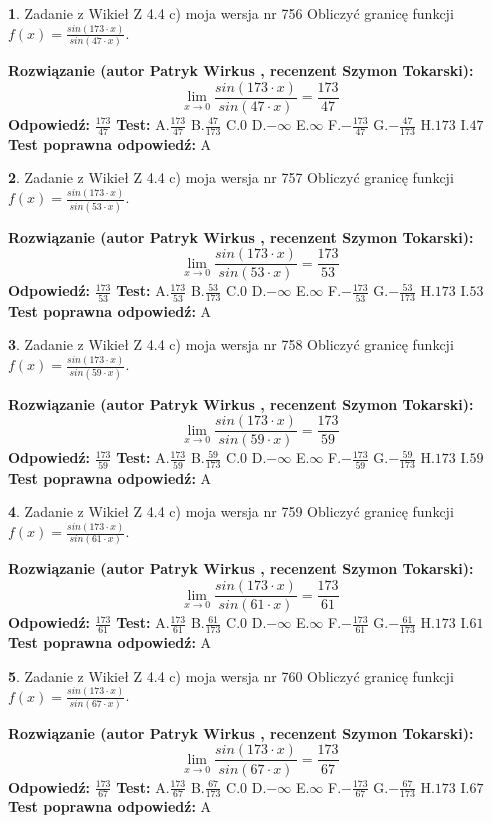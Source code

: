 \documentclass[12pt, a4paper]{article}
\theoremstyle{definition} %
\newtheorem{zad}{}
\newcommand{\zadStart}[1]{\begin{zad}#1\newline}
\newcommand{\zadStop}{\end{zad}}
\newcommand{\rozwStart}[2]{\noindent \textbf{Rozwiązanie (autor #1 , recenzent #2): }\newline}
\newcommand{\rozwStop}{\newline}
\newcommand{\odpStart}{\noindent \textbf{Odpowiedź:}\newline}
\newcommand{\odpStop}{\newline}
\newcommand{\testStart}{\noindent \textbf{Test:}\newline}
\newcommand{\testStop}{\newline}
\newcommand{\kluczStart}{\noindent \textbf{Test poprawna odpowiedź:}\newline}
\newcommand{\kluczStop}{\newline}
\begin{document}
\zadStart{Zadanie z Wikieł Z 4.4 c) moja wersja nr 756}
Obliczyć granicę funkcji $f(x)=\frac{sin(173\cdot x)}{sin(47\cdot x)}$.
\zadStop
\rozwStart{Patryk Wirkus}{Szymon Tokarski}
$$\lim\limits_{x\to 0}\frac{sin(173\cdot x)}{sin(47\cdot x)}=
\frac{173}{47}$$
\rozwStop
\odpStart
$\frac{173}{47}$
\odpStop
\testStart
A.$\frac{173}{47}$
B.$\frac{47}{173}$
C.$0$
D.$-\infty$
E.$\infty$
F.$-\frac{173}{47}$
G.$-\frac{47}{173}$
H.$173$
I.$47$
\testStop
\kluczStart
A
\kluczStop



\zadStart{Zadanie z Wikieł Z 4.4 c) moja wersja nr 757}
Obliczyć granicę funkcji $f(x)=\frac{sin(173\cdot x)}{sin(53\cdot x)}$.
\zadStop
\rozwStart{Patryk Wirkus}{Szymon Tokarski}
$$\lim\limits_{x\to 0}\frac{sin(173\cdot x)}{sin(53\cdot x)}=
\frac{173}{53}$$
\rozwStop
\odpStart
$\frac{173}{53}$
\odpStop
\testStart
A.$\frac{173}{53}$
B.$\frac{53}{173}$
C.$0$
D.$-\infty$
E.$\infty$
F.$-\frac{173}{53}$
G.$-\frac{53}{173}$
H.$173$
I.$53$
\testStop
\kluczStart
A
\kluczStop



\zadStart{Zadanie z Wikieł Z 4.4 c) moja wersja nr 758}
Obliczyć granicę funkcji $f(x)=\frac{sin(173\cdot x)}{sin(59\cdot x)}$.
\zadStop
\rozwStart{Patryk Wirkus}{Szymon Tokarski}
$$\lim\limits_{x\to 0}\frac{sin(173\cdot x)}{sin(59\cdot x)}=
\frac{173}{59}$$
\rozwStop
\odpStart
$\frac{173}{59}$
\odpStop
\testStart
A.$\frac{173}{59}$
B.$\frac{59}{173}$
C.$0$
D.$-\infty$
E.$\infty$
F.$-\frac{173}{59}$
G.$-\frac{59}{173}$
H.$173$
I.$59$
\testStop
\kluczStart
A
\kluczStop



\zadStart{Zadanie z Wikieł Z 4.4 c) moja wersja nr 759}
Obliczyć granicę funkcji $f(x)=\frac{sin(173\cdot x)}{sin(61\cdot x)}$.
\zadStop
\rozwStart{Patryk Wirkus}{Szymon Tokarski}
$$\lim\limits_{x\to 0}\frac{sin(173\cdot x)}{sin(61\cdot x)}=
\frac{173}{61}$$
\rozwStop
\odpStart
$\frac{173}{61}$
\odpStop
\testStart
A.$\frac{173}{61}$
B.$\frac{61}{173}$
C.$0$
D.$-\infty$
E.$\infty$
F.$-\frac{173}{61}$
G.$-\frac{61}{173}$
H.$173$
I.$61$
\testStop
\kluczStart
A
\kluczStop



\zadStart{Zadanie z Wikieł Z 4.4 c) moja wersja nr 760}
Obliczyć granicę funkcji $f(x)=\frac{sin(173\cdot x)}{sin(67\cdot x)}$.
\zadStop
\rozwStart{Patryk Wirkus}{Szymon Tokarski}
$$\lim\limits_{x\to 0}\frac{sin(173\cdot x)}{sin(67\cdot x)}=
\frac{173}{67}$$
\rozwStop
\odpStart
$\frac{173}{67}$
\odpStop
\testStart
A.$\frac{173}{67}$
B.$\frac{67}{173}$
C.$0$
D.$-\infty$
E.$\infty$
F.$-\frac{173}{67}$
G.$-\frac{67}{173}$
H.$173$
I.$67$
\testStop
\kluczStart
A
\kluczStop
\end{document}
